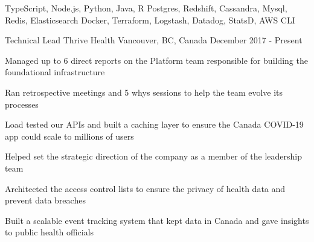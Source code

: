 \begin{cvskills}
   {TypeScript, Node.js, Python, Java, R}
   {Postgres, Redshift, Cassandra, Mysql, Redis, Elasticsearch}
   {Docker, Terraform, Logstash, Datadog, StatsD, AWS CLI}
\end{cvskills}




\begin{cventries}

  \cventry
    {Technical Lead} %
    {Thrive Health} %
    {Vancouver, BC, Canada} %
    {December 2017 - Present} %
    {
      \begin{cvitems} %
        \item {Managed up to 6 direct reports on the Platform team responsible for building the foundational infrastructure}
        \item {Ran retrospective meetings and 5 whys sessions to help the team evolve its processes}
        \item {Load tested our APIs and built a caching layer to ensure the Canada COVID-19 app could scale to millions of users}
        \item {Helped set the strategic direction of the company as a member of the leadership team}
        \item {Architected the access control lists to ensure the privacy of health data and prevent data breaches}
        \item {Built a scalable event tracking system that kept data in Canada and gave insights to public health officials}
      \end{cvitems}
    }



\end{cventries}
